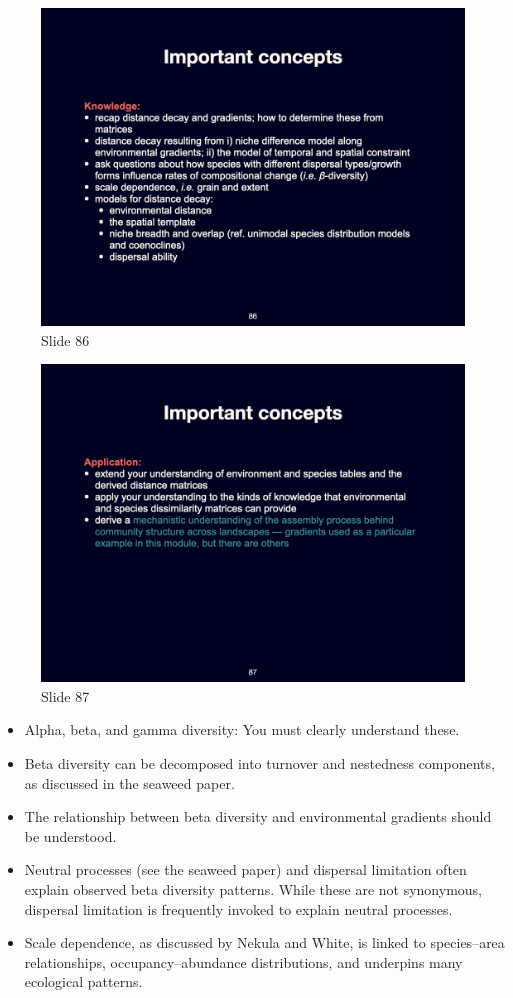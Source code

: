 \documentclass[
  10pt,
]{book}
\providecommand{\tightlist}{%
  \setlength{\itemsep}{0pt}\setlength{\parskip}{0pt}}
\begin{document}
\begin{figure}[ht]
\centering
\includegraphics[width=0.8\linewidth]{../images/BDC334/BDC334-086.jpeg}
\caption*{Slide 86}
\end{figure}

\begin{figure}[ht]
\centering
\includegraphics[width=0.8\linewidth]{../images/BDC334/BDC334-087.jpeg}
\caption*{Slide 87}
\end{figure}

\begin{itemize}
\tightlist
\item
  Alpha, beta, and gamma diversity: You must clearly understand these.
\item
  Beta diversity can be decomposed into turnover and nestedness
  components, as discussed in the seaweed paper.
\item
  The relationship between beta diversity and environmental gradients
  should be understood.
\item
  Neutral processes (see the seaweed paper) and dispersal limitation
  often explain observed beta diversity patterns. While these are not
  synonymous, dispersal limitation is frequently invoked to explain
  neutral processes.
\item
  Scale dependence, as discussed by Nekula and White, is linked to
  species--area relationships, occupancy--abundance distributions, and
  underpins many ecological patterns.
\end{itemize}
\end{document}
